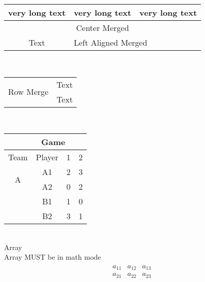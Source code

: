 \documentclass{article}
\begin{document}
\begin{center}
        \begin{tabular}{|c|c|c|}
            \hline
            very long text & very long text & very long text\\
            \hline
            \multicolumn{3}{|c|}{Center Merged}\\
            \hline
            Text & \multicolumn{2}{|l|}{Left Aligned Merged}\\
            \hline
        \end{tabular}\\[15pt]

        \begin{tabular}{|c|c|}
            \hline
            \multirow{2}{*}{Row Merge} & Text \\
            & Text \\
            \hline
        \end{tabular}\\[10pt]

        \begin{tabular}{|c|c||c|c|}
            \hhline{~~|--}
            \multicolumn{2}{c|}{} & \multicolumn{2}{c|}{Game}\\
            \hline
            Team & Player & 1 & 2\\
            \hline
            \multirow{2}{*}{A} & A1 & 2 & 3\\
            \hhline{|~|---|}
            & A2 & 0 & 2\\
            \hhline{|=|=#=|=|}
            \multirow{2}{*}{B} & B1 & 1 & 0\\
            \hhline{|~|---|}
            & B2 & 3 & 1\\
            \hline
        \end{tabular}\\[15pt]

        {\LARGE Array}\\[5pt]
        {\normalsize Array MUST be in math mode}\\[5pt]
        \begin{align*}
            \begin{array}{c|cc}
                a_{11} & a_{12} & a_{13}\\
                \hline
                a_{21} & a_{22} & a_{23}\\
            \end{array}
        \end{align*}\\[5pt]
        

\end{center}
\end{document}
